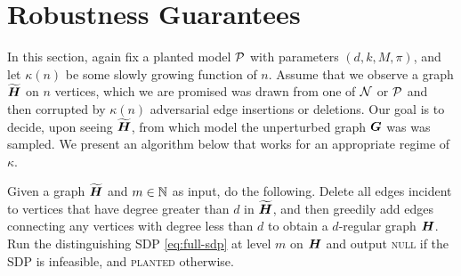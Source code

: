 \section{Robustness Guarantees} \label{sec:robust}

In this section, again fix a planted model $\mathcal{P}$ with parameters $(d,k,M,\pi)$, and let $\kappa(n)$ be some slowly growing function of $n$. Assume that we observe a graph $\widetilde{\boldsymbol{H}}$ on $n$ vertices, which we are promised was drawn from one of $\mathcal{N}$ or $\mathcal{P}$ and then corrupted by $\kappa(n)$ adversarial edge insertions or deletions. Our goal is to decide, upon seeing $\widetilde{\boldsymbol{H}}$, from which model the unperturbed graph $\boldsymbol{G}$ was was sampled. We present an algorithm below that works for an appropriate regime of $\kappa$. 

\begin{algorithm}	\label{alg:robust}
	Given a graph $\widetilde{\boldsymbol{H}}$ and $m \in \mathbb{N}$ as input, do the following.  Delete all edges incident to vertices that have degree greater than $d$ in $\widetilde{\boldsymbol{H}}$, and then greedily add edges connecting any vertices with degree less than $d$ to obtain a $d$-regular graph $\boldsymbol{H}$. Run the distinguishing SDP \eqref{eq:full-sdp} at level $m$ on $\boldsymbol{H}$ and output \textsc{null} if the SDP is infeasible, and \textsc{planted} otherwise.
\end{algorithm}


